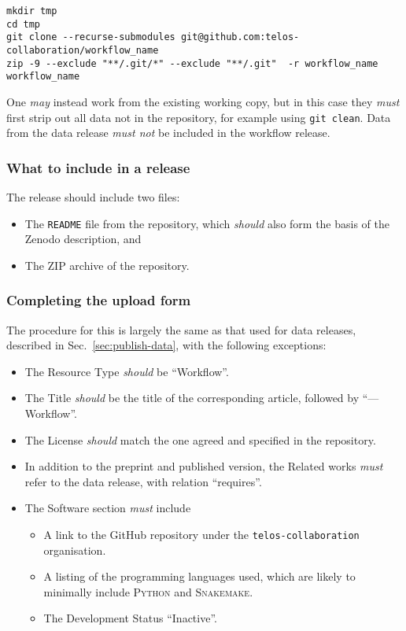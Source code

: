 \documentclass{article}
\newcommand\rfcword[1]{\emph{#1}\xspace}
\newcommand\must{\rfcword{must}}
\newcommand\mustnot{\rfcword{must not}}
\newcommand\should{\rfcword{should}}
\newcommand\may{\rfcword{may}}
\newcommand\filename[1]{\texttt{#1}\xspace}
\newcommand\readme{\filename{README}\xspace}
\newcommand\program[1]{\textsc{#1}\xspace}
\begin{document}
\begin{verbatim}
mkdir tmp
cd tmp
git clone --recurse-submodules git@github.com:telos-collaboration/workflow_name
zip -9 --exclude "**/.git/*" --exclude "**/.git"  -r workflow_name workflow_name
\end{verbatim}

One \may instead work from the existing working copy,
but in this case they \must first strip out all data not in the repository,
for example using \verb|git clean|.
Data from the data release \mustnot be included in the workflow release.

\subsubsection{What to include in a release}

The release should include two files:

\begin{itemize}
  \item
        The \readme file from the repository,
        which \should also form the basis of the Zenodo description, and
  \item
        The ZIP archive of the repository.
\end{itemize}

\subsubsection{Completing the upload form}

The procedure for this is largely the same as that used for data releases,
described in Sec.~\ref{sec:publish-data},
with the following exceptions:

\begin{itemize}
  \item
        The Resource Type \should be ``Workflow''.
  \item
        The Title \should be the title of the corresponding article,
        followed by ``---Workflow''.
  \item
        The License \should match the one agreed and specified in the repository.
  \item
        In addition to the preprint and published version,
        the Related works \must refer to the data release,
        with relation ``requires''.
  \item
        The Software section \must include
        \begin{itemize}
          \item
                A link to the GitHub repository under the \verb|telos-collaboration| organisation.
          \item
                A listing of the programming languages used,
                which are likely to minimally include
                \program{Python} and \program{Snakemake}.
          \item
                The Development Status ``Inactive''.
        \end{itemize}
\end{itemize}
\end{document}
